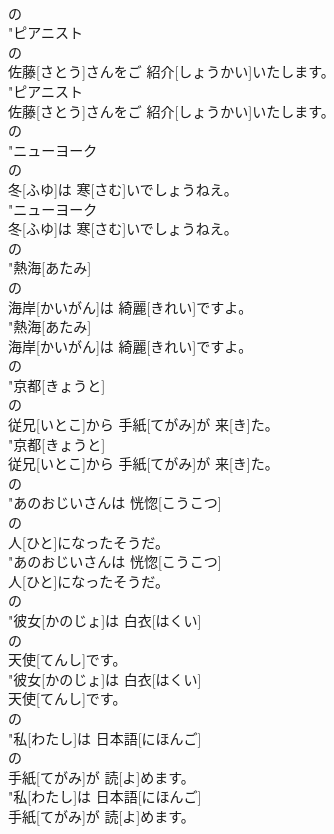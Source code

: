 \documentclass[8pt]{extreport}
\begin{document}
\begin{CJK}{UTF8}{min}
\\	の
\\	"ピアニスト
\\	の
\\	佐藤[さとう]さんをご 紹介[しょうかい]いたします。
\\	"ピアニスト
\\	佐藤[さとう]さんをご 紹介[しょうかい]いたします。
\\	の
\\	"ニューヨーク
\\	の
\\	冬[ふゆ]は 寒[さむ]いでしょうねえ。
\\	"ニューヨーク
\\	冬[ふゆ]は 寒[さむ]いでしょうねえ。
\\	の
\\	"熱海[あたみ]
\\	の
\\	海岸[かいがん]は 綺麗[きれい]ですよ。
\\	"熱海[あたみ]
\\	海岸[かいがん]は 綺麗[きれい]ですよ。
\\	の
\\	"京都[きょうと]
\\	の
\\	従兄[いとこ]から 手紙[てがみ]が 来[き]た。
\\	"京都[きょうと]
\\	従兄[いとこ]から 手紙[てがみ]が 来[き]た。
\\	の
\\	"あのおじいさんは 恍惚[こうこつ]
\\	の
\\	人[ひと]になったそうだ。
\\	"あのおじいさんは 恍惚[こうこつ]
\\	人[ひと]になったそうだ。
\\	の
\\	"彼女[かのじょ]は 白衣[はくい]
\\	の
\\	天使[てんし]です。
\\	"彼女[かのじょ]は 白衣[はくい]
\\	天使[てんし]です。
\\	の
\\	"私[わたし]は 日本語[にほんご]
\\	の
\\	手紙[てがみ]が 読[よ]めます。
\\	"私[わたし]は 日本語[にほんご]
\\	手紙[てがみ]が 読[よ]めます。

\end{CJK}
\end{document}
